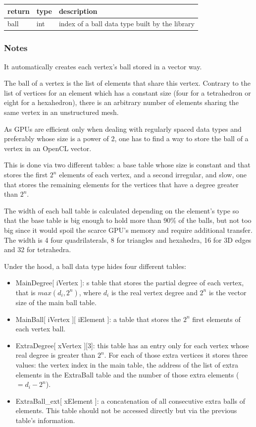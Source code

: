 \documentclass[a4paper,12pt]{article}
\begin{document}
\medskip

\begin{tabular}{|m{2cm}|m{1.5cm}|m{10.5cm}|}
\hline
return     & type   & description \\
\hline
ball       & int    & index of a ball data type built by the library \\
\hline
\end{tabular}
\subsubsection*{Notes}

It automatically creates each vertex's ball stored in a vector way.

The ball of a vertex is the list of elements that share this vertex. Contrary to the list of vertices for an element which has a constant size (four for a tetrahedron or eight for a hexahedron), there is an arbitrary number of elements sharing the same vertex in an unstructured mesh.

As GPUs are efficient only when dealing with regularly spaced data types and preferably whose size is a power of 2, one has to find a way to store the ball of a vertex in an OpenCL vector.

This is done via two different tables: a base table whose size is constant and that stores the first $2^n$ elements of each vertex, and a second irregular, and slow, one that stores the remaining elements for the vertices that have a degree greater than $2^n$.

The width of each ball table is calculated depending on the element's type so that the base table is big enough to hold more than 90\% of the balls, but not too big since it would spoil the scarce GPU's memory and require additional transfer. The width is 4 four quadrilaterals, 8 for triangles and hexahedra, 16 for 3D edges and 32 for tetrahedra.

\medskip

Under the hood, a ball data type hides four different tables:

\begin{itemize}
\item  MainDegree[ iVertex ]: s table that stores the partial degree of each vertex, that is $max(d_i, 2^n)$, where $d_i$ is the real vertex degree and $2^n$ is the vector size of the main ball table.
\item MainBall[ iVertex ][ iElement ]: a table that stores the $2^n$ first elements of each vertex ball.
\item ExtraDegree[ xVertex ][3]: this table has an entry only for each vertex whose real degree is greater than $2^n$. For each of those extra vertices it stores three values: the vertex index in the main table, the address of the list of extra elements in the ExtraBall table and the number of those extra elements ($ = d_i - 2^n$).
\item ExtraBall\_ext[ xElement ]: a concatenation of all consecutive extra balls of elements. This table should not be accessed directly but via the previous table's information.
\end{itemize}
\end{document}

